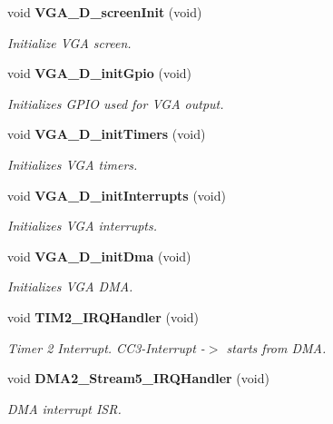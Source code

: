 \begin{DoxyCompactItemize}
\item 
void {\bf V\+G\+A\+\_\+\+D\+\_\+screen\+Init} (void)\label{vga__screen_8c_a54818b513bc50721e3414724e81d63dc}

\begin{DoxyCompactList}\small\item\em Initialize V\+GA screen. \end{DoxyCompactList}\item 
void {\bf V\+G\+A\+\_\+\+D\+\_\+init\+Gpio} (void)\label{vga__screen_8c_ab19664a6f56c7b194d96c9efbe9fdb0d}

\begin{DoxyCompactList}\small\item\em Initializes G\+P\+IO used for V\+GA output. \end{DoxyCompactList}\item 
void {\bf V\+G\+A\+\_\+\+D\+\_\+init\+Timers} (void)\label{vga__screen_8c_a7f81e81736a511dc5962d38b6932f172}

\begin{DoxyCompactList}\small\item\em Initializes V\+GA timers. \end{DoxyCompactList}\item 
void {\bf V\+G\+A\+\_\+\+D\+\_\+init\+Interrupts} (void)\label{vga__screen_8c_ae0c623841b4a18c412d175c13941c090}

\begin{DoxyCompactList}\small\item\em Initializes V\+GA interrupts. \end{DoxyCompactList}\item 
void {\bf V\+G\+A\+\_\+\+D\+\_\+init\+Dma} (void)\label{vga__screen_8c_a759d1d311be7995699a6550ee2329d15}

\begin{DoxyCompactList}\small\item\em Initializes V\+GA D\+MA. \end{DoxyCompactList}\item 
void {\bf T\+I\+M2\+\_\+\+I\+R\+Q\+Handler} (void)
\begin{DoxyCompactList}\small\item\em Timer 2 Interrupt. C\+C3-\/\+Interrupt -\/$>$ starts from D\+MA. \end{DoxyCompactList}\item 
void {\bf D\+M\+A2\+\_\+\+Stream5\+\_\+\+I\+R\+Q\+Handler} (void)
\begin{DoxyCompactList}\small\item\em D\+MA interrupt I\+SR. \end{DoxyCompactList}\end{DoxyCompactItemize}


